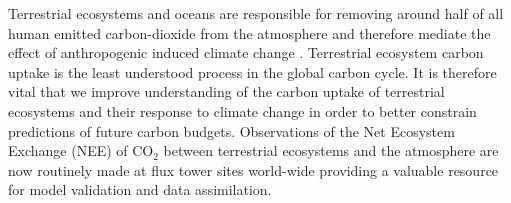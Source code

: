\documentclass[11pt]{article}
\begin{document}
Terrestrial ecosystems and oceans are responsible for removing around half of all human emitted carbon-dioxide from the atmosphere and therefore mediate the effect of anthropogenic induced climate change \citep{ciais2014carbon}. Terrestrial ecosystem carbon uptake is the least understood process in the global carbon cycle. It is therefore vital that we improve understanding of the carbon uptake of terrestrial ecosystems and their response to climate change in order to better constrain predictions of future carbon budgets. Observations of the Net Ecosystem Exchange (NEE) of CO$_{2}$ between terrestrial ecosystems and the atmosphere are now routinely made at flux tower sites world-wide \citep{baldocchi2008turner} providing a valuable resource for model validation and data assimilation.
\end{document}
